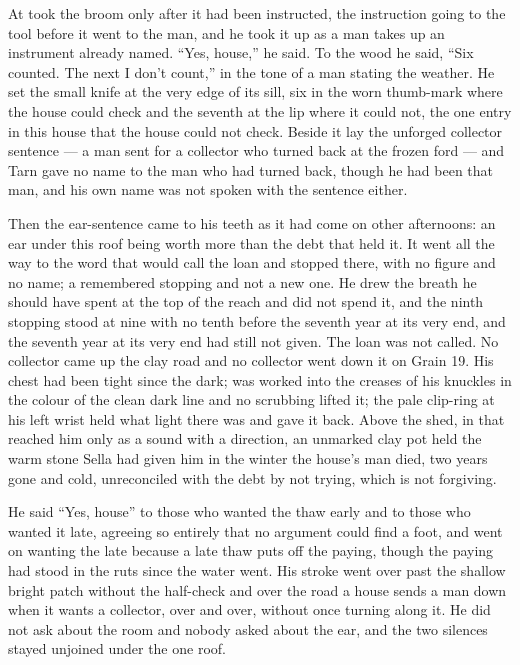 \scenebreak

At   took the broom only after it had been instructed, the instruction going to the tool before it went to the man, and he took it up as a man takes up an instrument already named. “Yes, house,” he said. To the wood he said, “Six counted. The next I don't count,” in the tone of a man stating the weather. He set the small knife at the very edge of its sill, six in the worn thumb-mark where the house could check and the seventh at the lip where it could not, the one entry in this house that the house could not check. Beside it lay the unforged collector sentence --- a man sent for a collector who turned back at the frozen ford --- and Tarn gave no name to the man who had turned back, though he had been that man, and his own name was not spoken with the sentence either.

Then the ear-sentence came to his teeth as it had come on other afternoons: an ear under this roof being worth more than the debt that held it. It went all the way to the word that would call the loan and stopped there, with no figure and no name; a remembered stopping and not a new one. He drew the breath he should have spent at the top of the reach and did not spend it, and the ninth stopping stood at nine with no tenth before the seventh year at its very end, and the seventh year at its very end had still not given. The loan was not called. No collector came up the clay road and no collector went down it on Grain 19. His chest had been tight since the dark;  was worked into the creases of his knuckles in the colour of the clean dark line and no scrubbing lifted it; the pale clip-ring at his left wrist held what light there was and gave it back. Above the shed, in  that reached him only as a sound with a direction, an unmarked clay pot held the warm stone Sella had given him in the winter the house's man died, two years gone and cold, unreconciled with the debt by not trying, which is not forgiving.

He said “Yes, house” to those who wanted the thaw early and to those who wanted it late, agreeing so entirely that no argument could find a foot, and went on wanting the late because a late thaw puts off the paying, though the paying had stood in the ruts since the water went. His stroke went over  past the shallow bright patch without the half-check and over the road a house sends a man down when it wants a collector, over and over, without once turning along it. He did not ask about the room and nobody asked about the ear, and the two silences stayed unjoined under the one roof.

